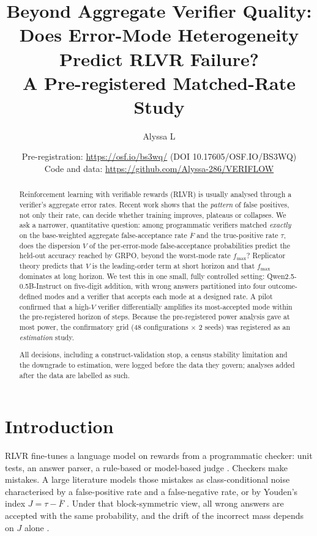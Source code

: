 \documentclass[11pt]{article}
\title{Beyond Aggregate Verifier Quality:\\ Does Error-Mode Heterogeneity Predict RLVR Failure?\\[4pt]
\large A Pre-registered Matched-Rate Study}
\author{Alyssa L}
\date{Pre-registration: \url{https://osf.io/bs3wq/} (DOI 10.17605/OSF.IO/BS3WQ)\\ Code and data: \url{https://github.com/Alyssa-286/VERIFLOW}}
\newcommand{\Fbar}{\overline{F}}
\newcommand{\fmax}{f_{\max}}
\begin{document}
\maketitle

\begin{abstract}
Reinforcement learning with verifiable rewards (RLVR) is usually analysed through a verifier's aggregate error rates.
Recent work shows that the \emph{pattern} of false positives, not only their rate, can decide whether training improves, plateaus or collapses.
We ask a narrower, quantitative question: among programmatic verifiers matched \emph{exactly} on the base-weighted aggregate false-acceptance rate $\Fbar$ and the true-positive rate $\tau$, does the dispersion $V$ of the per-error-mode false-acceptance probabilities predict the held-out accuracy reached by GRPO, beyond the worst-mode rate $\fmax$?
Replicator theory predicts that $V$ is the leading-order term at short horizon and that $\fmax$ dominates at long horizon.
We test this in one small, fully controlled setting: Qwen2.5-0.5B-Instruct on five-digit addition, with wrong answers partitioned into four outcome-defined modes and a verifier that accepts each mode at a designed rate.
A pilot confirmed that a high-$V$ verifier differentially amplifies its most-accepted mode within the pre-registered horizon of \HorizonT{} steps.
Because the pre-registered power analysis gave at most \PowC{} power, the confirmatory grid (48 configurations $\times$ 2 seeds) was registered as an \emph{estimation} study.

All decisions, including a construct-validation stop, a census stability limitation and the downgrade to estimation, were logged before the data they govern; analyses added after the data are labelled as such.
\end{abstract}

\section{Introduction}
RLVR fine-tunes a language model on rewards from a programmatic checker: unit tests, an answer parser, a rule-based or model-based judge \citep{shao2024deepseekmath,yu2025dapo}.
Checkers make mistakes. A large literature models those mistakes as class-conditional noise characterised by a false-positive rate and a false-negative rate, or by Youden's index $J=\tau-\Fbar$ \citep{rad2026rate,cai2025reinforcement,mansouri2025noisecorrected}.
Under that block-symmetric view, all wrong answers are accepted with the same probability, and the drift of the incorrect mass depends on $J$ alone \citep{rad2026rate}.
\end{document}
